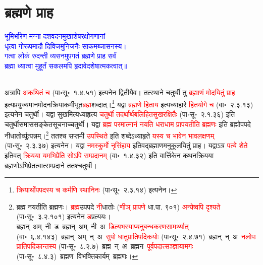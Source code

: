 \section[ब्रह्मणे प्राह]{ब्रह्मणे प्राह}
\centering\textcolor{blue}{भूमिर्भारेण मग्ना दशवदनमुखाशेषरक्षोगणानां\nopagebreak\\
धृत्वा गोरूपमादौ दिविजमुनिजनैः साकमब्जासनस्य।\nopagebreak\\
गत्वा लोकं रुदन्ती व्यसनमुपगतं ब्रह्मणे प्राह सर्वं\nopagebreak\\
ब्रह्मा ध्यात्वा मुहूर्तं सकलमपि हृदावेदशेषात्मकत्वात्॥}\nopagebreak\\
\\
\begin{sloppypar}\justifying\noindent\hspace{10mm} अत्रापि \textcolor{red}{अकथितं च} (पा॰सू॰~१.४.५१) इत्यनेन द्वितीयैव। तत्स्थाने चतुर्थी तु \textcolor{red}{ब्रह्माणं मोदयितुं प्राह} इत्यप्रयुज्यमान\-मोदन\-क्रिया\-कर्मीभूत\-\textcolor{red}{ब्रह्म}\-शब्दात्।\footnote{\textcolor{red}{क्रियार्थोपपदस्य च कर्मणि स्थानिनः} (पा॰सू॰~२.३.१४) इत्यनेन।} यद्वा \textcolor{red}{ब्रह्मणे हिताय} इत्यध्याहारे \textcolor{red}{हित\-योगे च} (वा॰~२.३.१३) इत्यनेन चतुर्थी। यद्वा सुखमित्यध्याहृत्य \textcolor{red}{चतुर्थी तदर्थार्थबलिहितसुखरक्षितैः} (पा॰सू॰~२.१.३६) इति चतुर्थी\-समास\-सङ्केत\-सूचनाच्चतुर्थी। यद्वा \textcolor{red}{ब्रह्म परमात्मानं नयति धरा\-धाम प्रापयतीति ब्रह्मणः} इति ब्रह्मोपपदे नी\-धातोर्व्युत्पन्नम्।\footnote{ब्रह्म नयतीति ब्रह्मणः। \textcolor{red}{ब्रह्म}\-उपपदे \textcolor{red}{नी}\-धातोः (\textcolor{red}{णीञ् प्रापणे} धा.पा. ९०१) \textcolor{red}{अन्येष्वपि दृश्यते} (पा॰सू॰~३.२.१०१) इत्यनेन \textcolor{red}{ड}\-प्रत्ययः। ब्रह्मन्~अम्~नी~ड~\arrow ब्रह्मन्~अम्~नी~अ~\arrow \textcolor{red}{डित्यभस्याप्यनु\-बन्धकरण\-सामर्थ्यात्‌} (वा॰~६.४.१४३)~\arrow ब्रह्मन्~अम्~न्~अ~\arrow \textcolor{red}{सुपो धातुप्रातिपदिकयोः} (पा॰सू॰~२.४.७१)~\arrow ब्रह्मन्~न्~अ~\arrow \textcolor{red}{नलोपः प्रातिपदिकान्तस्य} (पा॰सू॰~८.२.७)~\arrow ब्रह्म~न्~अ~\arrow ब्रह्मन~\arrow \textcolor{red}{पूर्वपदात्सञ्ज्ञायामगः} (पा॰सू॰~८.४.३)~\arrow ब्रह्मण~\arrow विभक्ति\-कार्यम्~\arrow ब्रह्मणः।} ततश्च सप्तमी \textcolor{red}{उपस्थिते} इति शब्देऽध्याहृते \textcolor{red}{यस्य च भावेन भाव\-लक्षणम्‌} (पा॰सू॰~२.३.३७) इत्यनेन। यद्वा \textcolor{red}{नमस्कुर्मो नृसिंहाय} इतिवद्ब्रह्माणमनुकूलयितुं प्राह। यद्वाऽत्र \textcolor{red}{पत्ये शेते} इतिवत् \textcolor{red}{क्रियया यमभिप्रैति सोऽपि सम्प्रदानम्‌} (वा॰~१.४.३२) इति वार्त्तिकेन कथन\-क्रियया ब्रह्मणोऽभिप्रेतत्वात्सम्प्रदाने ततश्चतुर्थी।\end{sloppypar}
